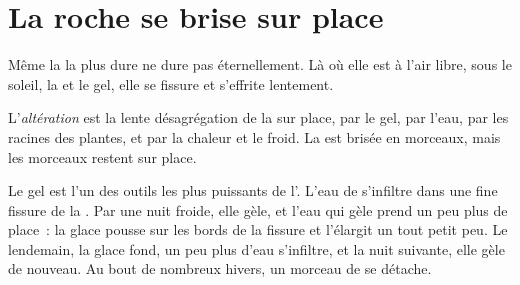 \section{La roche se brise sur place}

Même la  la plus dure ne dure pas éternellement. Là où elle est à
l'air libre, sous le soleil, la  et le gel, elle se fissure et
s'effrite lentement.

\begin{definition}[Altération]\label{def:g5:water-shapes-the-land:weathering}
L'\emph{altération} est la lente
désagrégation de la  sur place, par le gel, par l'eau, par les racines
des plantes, et par la chaleur et le froid. La  est brisée en
morceaux, mais les morceaux restent sur place.
\end{definition}

Le gel est l'un des outils les plus puissants de l'. L'eau de
 s'infiltre dans une fine fissure de la . Par une nuit froide,
elle gèle, et l'eau qui gèle prend un peu plus de place~: la glace pousse
sur les bords de la fissure et l'élargit un tout petit peu. Le lendemain,
la glace fond, un peu plus d'eau s'infiltre, et la nuit suivante, elle
gèle de nouveau. Au bout de nombreux hivers, un morceau de  se
détache.

